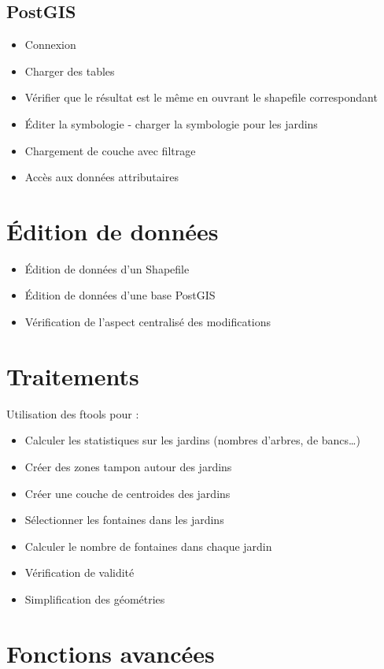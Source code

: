 \subsection{PostGIS}
\begin{itemize}[label=--]
\item Connexion
\item Charger des tables
\item Vérifier que le résultat est le même en ouvrant le shapefile correspondant
\item Éditer la symbologie - charger la symbologie pour les jardins
\item Chargement de couche avec filtrage
\item Accès aux données attributaires
\end{itemize}


\section{Édition de données}

\begin{itemize}[label=--]
\item Édition de données d'un Shapefile
\item Édition de données d'une base PostGIS
\item Vérification de l'aspect centralisé des modifications
\end{itemize}

\section{Traitements} 
Utilisation des ftools pour :
\begin{itemize}[label=--]
\item Calculer les statistiques sur les jardins (nombres d'arbres, de bancs…)
\item Créer des zones tampon autour des jardins
\item Créer une couche de centroides des jardins
\item Sélectionner les fontaines dans les jardins
\item Calculer le nombre de fontaines dans chaque jardin
\item Vérification de validité
\item Simplification des géométries
\end{itemize}

\section{Fonctions avancées}

